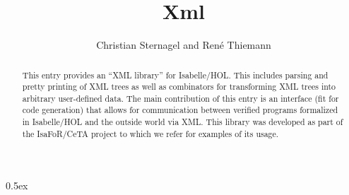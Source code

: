 \documentclass[11pt,a4paper]{article}
\begin{document}
\title{Xml}
\author{Christian Sternagel and Ren\'e Thiemann}
\maketitle

\begin{abstract}
This entry provides an ``XML library'' for Isabelle/HOL. This includes parsing
and pretty printing of XML trees as well as combinators for transforming XML
trees into arbitrary user-defined data. The main contribution of this entry is
an interface (fit for code generation) that allows for communication between
verified programs formalized in Isabelle/HOL and the outside world via XML. This
library was developed as part of the IsaFoR/CeTA project to which we refer for
examples of its usage. 
\end{abstract}

\tableofcontents

\parindent 0pt\parskip 0.5ex



%
%
\end{document}
